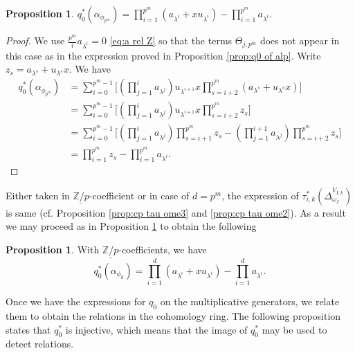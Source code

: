 \documentclass[a4paper,leqno,11pt]{amsart}
\theoremstyle{plain}
\theoremstyle{definition}
\newtheorem{prop}[theorem]{Proposition}
\theoremstyle{remark}
\theoremstyle{definition}
\def\a{\alpha}
\numberwithin{equation}{section}
\newcommand{\Zp}{\underline{{\mathbb Z}/p}}
\begin{document}
	\begin{prop}\label{prop:q0 of alp zp d=pm}
		$ q_0^*(\a_{\phi_{p^m}})=\prod_{i=1}^{p^m}(a_{\lambda^i}+xu_{\lambda^i})- \prod_{i=1}^{p^m} a_{\lambda^i}	 $.
	\end{prop}
	\begin{proof}
	We use $\frac{p^m}{i}a_{\lambda^i}=0$ \eqref{eq:a rel Z} so that the terms $\Theta_{j,p^m}$ does not appear in this case as in the expression proved in Proposition \ref{prop:q0 of alp}. 
	Write $ z_s=a_{\lambda^s}+u_{\lambda^s} x$. We have 	
\[\begin{aligned}  
q_0^*(\a_{\phi_{p^m}})&=\sum_{i=0}^{p^m-1}\Big[(\prod_{j=1}^{i} a_{\lambda^j}) u_{\lambda^{i+1}}x\prod_{s=i+2}^{p^m}(a_{\lambda^s}+u_{\lambda^s} x)\Big] \\
&=\sum_{i=0}^{p^m-1}\Big[(\prod_{j=1}^{i} a_{\lambda^j}) u_{\lambda^{i+1}}x\prod_{s=i+2}^{p^m}z_s\Big] \\
&=\sum_{i=0}^{p^m-1}\Big[(\prod_{j=1}^{i} a_{\lambda^j}) \prod_{s=i+1}^{p^m}z_s - (\prod_{j=1}^{i+1} a_{\lambda^j}) \prod_{s=i+2}^{p^m}z_s\Big]\\
&= \prod_{i=1}^{p^m} z_s - \prod_{i=1}^{p^m} a_{\lambda^i}.
\end{aligned}\]
	\end{proof}	
	Either taken in $ \Zp $-coefficient or in case of $ d=p^m $, the expression of $ \tau_{i,k}^*(\Delta^{V_{I,k}}_{\omega _I}) $ is same 
	(cf. Proposition \ref{prop:cp tau ome3} and \ref{prop:cp tau ome2}). As a result we may proceed as in Proposition \ref{prop:q0 of alp zp d=pm} to obtain the following 
	\begin{prop}\label{prop:q0 of alp zp}
		With $ \Zp $-coefficients, we have  
		$$ q_0^*(\a_{\phi_{d}})=\prod_{i=1}^{d}(a_{\lambda^i}+xu_{\lambda^i})- \prod_{i=1}^{d} a_{\lambda^i}.
		$$
	\end{prop}
	Once we have the expressions for $q_0$ on the multiplicative generators, we relate them to obtain the relations in the cohomology ring. The following proposition states that $q_0^\ast$ is injective, which means that the image of $q_0^\ast$ may be used to detect relations. 
	
\end{document}
